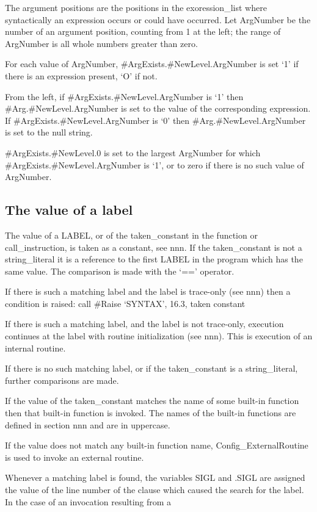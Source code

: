 The argument positions are the positions in the exoression\_list where
syntactically an expression occurs or could have occurred. Let ArgNumber
be the number of an argument position, counting from 1 at the left; the
range of ArgNumber is all whole numbers greater than zero.

For each value of ArgNumber, \#ArgExists.\#NewLevel.ArgNumber is set `1'
if there is an expression present, `O' if not.

From the left, if \#ArgExists.\#NewLevel.ArgNumber is `1' then
\#Arg.\#NewLevel.ArgNumber is set to the value of the corresponding
expression. If \#ArgExists.\#NewLevel.ArgNumber is `0' then
\#Arg.\#NewLevel.ArgNumber is set to the null string.

\#ArgExists.\#NewLevel.0 is set to the largest ArgNumber for which
\#ArgExists.\#NewLevel.ArgNumber is `1', or to zero if there is no such
value of ArgNumber.

\hypertarget{the-value-of-a-label}{%
\subsection{The value of a label}\label{the-value-of-a-label}}

The value of a LABEL, or of the taken\_constant in the function or
call\_instruction, is taken as a constant, see nnn. If the
taken\_constant is not a string\_literal it is a reference to the first
LABEL in the program which has the same value. The comparison is made
with the `==' operator.

If there is such a matching label and the label is trace-only (see nnn)
then a condition is raised: call \#Raise `SYNTAX', 16.3, taken constant

If there is such a matching label, and the label is not trace-only,
execution continues at the label with routine initialization (see nnn).
This is execution of an internal routine.

If there is no such matching label, or if the taken\_constant is a
string\_literal, further comparisons are made.

If the value of the taken\_constant matches the name of some built-in
function then that built-in function is invoked. The names of the
built-in functions are defined in section nnn and are in uppercase.

If the value does not match any built-in function name,
Config\_ExternalRoutine is used to invoke an external routine.

Whenever a matching label is found, the variables SIGL and .SIGL are
assigned the value of the line number of the clause which caused the
search for the label. In the case of an invocation resulting from a

